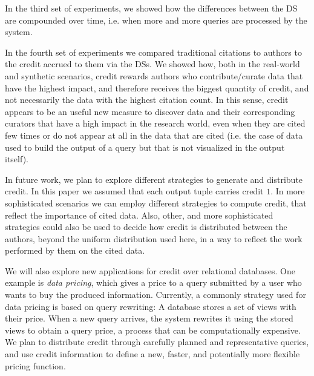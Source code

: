 In the third set of experiments, we showed how the differences between the DS are compounded over time, i.e. when more and more queries are processed by the system.

In the fourth set of experiments we compared traditional citations to authors to the credit accrued to them via the DSs. We showed how, both in the real-world and synthetic scenarios, credit rewards authors 
who contribute/curate data that have the highest impact, and therefore receives the biggest quantity of credit, and not necessarily the data with the highest citation count. 
In this sense, credit appears to be an useful new measure to discover data and their corresponding curators that have a high impact in the research world, even when they are cited few times or do not appear at all in the data that are cited (i.e. the case of data used to build the output of a query but that is not visualized in the output itself).

 

In future work, we plan to explore different strategies to generate and distribute credit. In this paper we assumed that each output tuple carries credit $1$. In more sophisticated scenarios we can employ different strategies to compute credit, that reflect the importance of cited data.
Also, other, and more sophisticated strategies could also be used to decide how credit is distributed between the authors, beyond the uniform distribution used here, in a way to reflect the work performed by them on the cited data.

We will also explore new applications for credit over relational databases.
One example is \emph{data pricing}, which gives a price to a query submitted by a user who wants to buy the produced information. Currently, a commonly strategy used for data pricing is based on query rewriting:  A database stores a set of views with their price. When a new query arrives, the system rewrites it using the stored views to obtain a query price, a process that can be computationally expensive.
We plan to distribute credit through carefully planned and representative queries, and use credit information to define a new, faster, and potentially more flexible pricing function.

